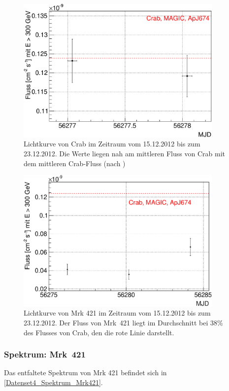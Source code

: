 \begin{figure}
    \centering
    \includegraphics[width=0.9\textwidth]{./Plots/04_MrkAnalyse/Datenset4/Datenset4_LC_Crab.pdf}
    \caption{Lichtkurve von Crab im Zeitraum vom 15.12.2012 bis zum 23.12.2012.
    Die Werte liegen nah am mittleren Fluss von Crab mit dem mittleren Crab-Fluss (nach \cite{LiteraturreferenzMAGIC})}
    \label{Datenset4_LC_Crab}
\end{figure}

\begin{figure}
    \centering
    \includegraphics[width=0.9\textwidth]{./Plots/04_MrkAnalyse/Datenset4/Datenset4_LC_Mrk421.pdf}
    \caption{Lichtkurve von Mrk 421 im Zeitraum vom 15.12.2012 bis zum 23.12.2012.
    Der Fluss von Mrk~421 liegt im Durchschnitt bei 38\% des Flusses von Crab, den die rote Linie darstellt.}
    \label{Datenset4_LC_Mrk421}
\end{figure}


\subsubsection{Spektrum: Mrk~421}
Das entfaltete Spektrum von Mrk 421 befindet sich in \autoref{Datenset4_Spektrum_Mrk421}.

